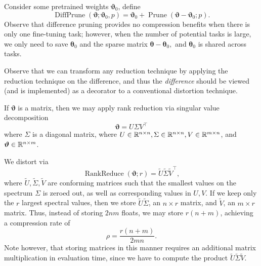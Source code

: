 \documentclass[10pt]{article}
\newcommand{\prune}{\operatorname{Prune}}
\newcommand{\diffprune}{\operatorname{DiffPrune}}
\newcommand{\rankreduce}{\operatorname{RankReduce}}
\newcommand{\btheta}{{\bm{\theta}}}
\newcommand{\bvartheta}{{\bm{\vartheta}}}
\begin{document}
 Consider some pretrained weights
$\bvartheta_0$, define \[
\diffprune(\bvartheta; \bvartheta_0, p ) = \bvartheta_0 + \prune(\bvartheta -
\bvartheta_0 ; p). 
\]
Observe that difference pruning provides no compression benefits when there is
only one fine-tuning task; however, when the number of potential tasks is
large, we only need to save $\btheta_0$ and the sparse matrix $\btheta -
\btheta_0,$ and $\btheta_0$ is shared across tasks.

Observe that we can transform any reduction technique by applying the
reduction technique on the difference, and thus the \emph{difference} should
be viewed (and is implemented) as a decorator to a conventional distortion
technique.


 If $\bvartheta$ is a matrix, then we may apply
rank
reduction via singular value decomposition \[
\bvartheta = U\Sigma V^\top
\]
where $\Sigma$ is a diagonal matrix, where $U \in \mathbb{R}^{n\times n}, \Sigma\in \mathbb{R}^
{n\times n}, V\in \mathbb{R}^{m\times n}$, and $\bvartheta \in \R^{n\times m}$.

We distort via \[
\rankreduce(\bvartheta; r) = \tilde U \tilde \Sigma \tilde V^\top,
\]
where $\tilde U, \tilde \Sigma, \tilde V$ are conforming matrices such that the
smallest values on the spectrum $\Sigma$ is zeroed out, as well as corresponding
values in $U,V$. If we keep only the $r$ largest spectral values, then we store
$\tilde U \tilde \Sigma$, an $n\times r$ matrix, and $\tilde V$, an $m\times r$
matrix. Thus, instead of storing $2nm$ floats, we may store $r(n+m)$, achieving
a compression rate of \[
\rho = \frac{r(n+m)}{2mn}.
\]
Note however, that storing matrices in this manner requires an additional
matrix multiplication in evaluation time, since we have to compute the product
$\tilde U \tilde \Sigma \tilde V$.




\end{document}
